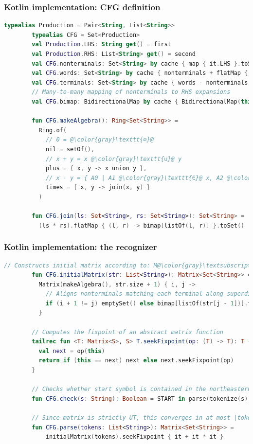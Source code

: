 \documentclass{beamer}
\begin{document}
    \begin{frame}[fragile]
        \frametitle{Kotlin implementation: CFG definition}
        \begin{lstlisting}[language=Kotlin, gobble=8, basicstyle=\scriptsize\ttfamily]
        typealias Production = Pair<String, List<String>>
        typealias CFG = Set<Production>
        val Production.LHS: String get() = first
        val Production.RHS: List<String> get() = second
        val CFG.nonterminals: Set<String> by cache { map { it.LHS }.toSet() }
        val CFG.words: Set<String> by cache { nonterminals + flatMap { it.RHS } }
        val CFG.terminals: Set<String> by cache { words - nonterminals }
        // Many-to-many mapping of nonterminals to RHS expansions
        val CFG.bimap: BidirectionalMap by cache { BidirectionalMap(this) }

        fun CFG.makeAlgebra(): Ring<Set<String>> =
          Ring.of(
            // 0 = @\color{gray}\texttt{∅}@
            nil = setOf(),
            // x + y = x @\color{gray}\texttt{∪}@ y
            plus = { x, y -> x union y },
            // x · y = { A0 | A1 @\color{gray}\texttt{∈}@ x, A2 @\color{gray}\texttt{∈}@ y, (A0 -> A1 A2) @\color{gray}\texttt{∈}@ P }
            times = { x, y -> join(x, y) }
          )

        fun CFG.join(ls: Set<String>, rs: Set<String>): Set<String> =
          (ls * rs).flatMap { (l, r) -> bimap[listOf(l, r)] }.toSet()
        \end{lstlisting}
    \end{frame}

    \begin{frame}[fragile]
        \frametitle{Kotlin implementation: the recognizer}
        \begin{lstlisting}[language=Kotlin, gobble=8, basicstyle=\scriptsize\ttfamily]
        // Constructs initial matrix according to: M@\color{gray}\textsubscript{i+1=j}@ = { A | (A -> @\color{gray}\texttt{σ}\textsubscript{i}@) @\color{gray}\texttt{∈}@ P }
        fun CFG.initialMatrix(str: List<String>): Matrix<Set<String>> =
          Matrix(makeAlgebra(), str.size + 1) { i, j ->
            // Aligns nonterminals matching each terminal along superdiagonal
            if (i + 1 != j) emptySet() else bimap[listOf(str[j - 1])].toSet()
          }

        // Computes the fixpoint of an abstract matrix function
        tailrec fun <T: Matrix<S>, S> T.seekFixpoint(op: (T) -> T): T {
          val next = op(this)
          return if (this == next) next else next.seekFixpoint(op)
        }

        // Checks whether start symbol is contained in the northeasternmost entry
        fun CFG.check(s: String): Boolean = START in parse(tokenize(s))[0].last()

        // Since matrix is strictly UT, this converges in at most |tokens| steps
        fun CFG.parse(tokens: List<String>): Matrix<Set<String>> =
            initialMatrix(tokens).seekFixpoint { it + it * it }
        \end{lstlisting}
    \end{frame}
\end{document}
